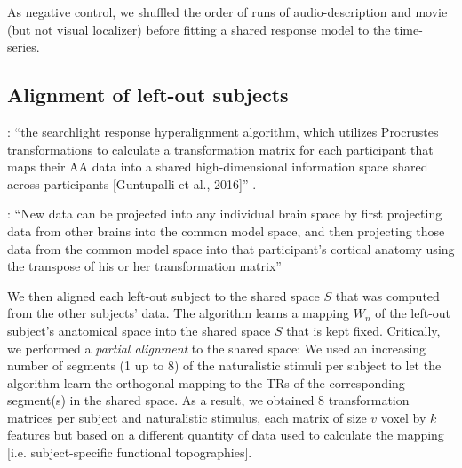 
As negative control, we shuffled the order of runs of audio-description and
movie (but not visual localizer) before fitting a shared response model to the
time-series.


\subsection{Alignment of left-out subjects}


%
%


%
\citep{busch2021hybrid}: ``the searchlight response hyperalignment algorithm,
which utilizes Procrustes transformations to calculate a transformation matrix
for each participant that maps their AA data into a shared high-dimensional
information space shared across participants [Guntupalli et al., 2016]''
\citep{busch2021hybrid}.

%
\citep{jiahui2020predicting}: ``New data can be projected into any individual
brain space by first projecting data from other brains into the common model
space, and then projecting those data from the common model space into that
participant's cortical anatomy using the transpose of his or her transformation
matrix'' \citep{jiahui2020predicting}

%
We then aligned each left-out subject to the shared space $S$ that was computed
from the other subjects' data.
%
The algorithm learns a mapping $W_{n}$ of the left-out subject's anatomical
space into the shared space $S$ that is kept fixed.
%
Critically, we performed a \textit{partial alignment} to the shared space:
%
We used an increasing number of segments (1 up to 8) of the naturalistic stimuli
per subject to let the algorithm learn the orthogonal mapping to the TRs of the
corresponding segment(s) in the shared space.
%
As a result, we obtained 8 transformation matrices per subject and naturalistic
stimulus, each matrix of size $v$ voxel by $k$ features but based on a different
quantity of data used to calculate the mapping [i.e. subject-specific functional
topographies].


